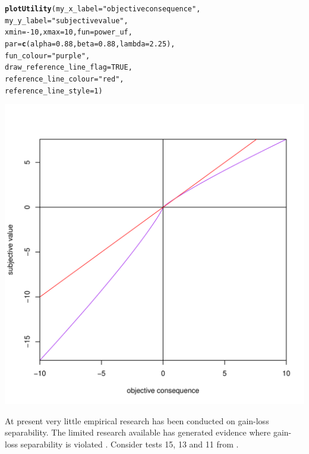 \documentclass{article}\usepackage[]{graphicx}\usepackage[]{color}
\makeatletter
\newcommand{\hlnum}[1]{\textcolor[rgb]{0.686,0.059,0.569}{#1}}%
\newcommand{\hlstr}[1]{\textcolor[rgb]{0.192,0.494,0.8}{#1}}%
\newcommand{\hlopt}[1]{\textcolor[rgb]{0,0,0}{#1}}%
\newcommand{\hlstd}[1]{\textcolor[rgb]{0.345,0.345,0.345}{#1}}%
\newcommand{\hlkwc}[1]{\textcolor[rgb]{0.333,0.667,0.333}{#1}}%
\newcommand{\hlkwd}[1]{\textcolor[rgb]{0.737,0.353,0.396}{\textbf{#1}}}%
\newenvironment{kframe}{%
 \def\at@end@of@kframe{}%
 \ifinner\ifhmode%
  \def\at@end@of@kframe{\end{minipage}}%
  \begin{minipage}{\columnwidth}%
 \fi\fi%
 \def\FrameCommand##1{\hskip\@totalleftmargin \hskip-\fboxsep
 \colorbox{shadecolor}{##1}\hskip-\fboxsep
     \hskip-\linewidth \hskip-\@totalleftmargin \hskip\columnwidth}%
 \MakeFramed {\advance\hsize-\width
   \@totalleftmargin\z@ \linewidth\hsize
   \@setminipage}}%
 {\par\unskip\endMakeFramed%
 \at@end@of@kframe}
\newenvironment{knitrout}{}{} %
\makeatother
\begin{document}
\begin{knitrout}
\color{fgcolor}\begin{kframe}
\begin{alltt}
\hlkwd{plotUtility}\hlstd{(}\hlkwc{my_x_label} \hlstd{=} \hlstr{"objective consequence"}\hlstd{,}
        \hlkwc{my_y_label} \hlstd{=} \hlstr{"subjective value"}\hlstd{,}
        \hlkwc{xmin} \hlstd{=} \hlopt{-}\hlnum{10}\hlstd{,} \hlkwc{xmax} \hlstd{=} \hlnum{10}\hlstd{,} \hlkwc{fun}\hlstd{=power_uf,}
        \hlkwc{par}\hlstd{=}\hlkwd{c}\hlstd{(}\hlkwc{alpha} \hlstd{=} \hlnum{0.88}\hlstd{,} \hlkwc{beta} \hlstd{=} \hlnum{0.88}\hlstd{,} \hlkwc{lambda} \hlstd{=} \hlnum{2.25}\hlstd{),}
        \hlkwc{fun_colour} \hlstd{=} \hlstr{"purple"}\hlstd{,}
        \hlkwc{draw_reference_line_flag} \hlstd{=} \hlnum{TRUE}\hlstd{,}
        \hlkwc{reference_line_colour} \hlstd{=} \hlstr{"red"}\hlstd{,}
        \hlkwc{reference_line_style} \hlstd{=} \hlnum{1}\hlstd{)}
\end{alltt}
\end{kframe}

{\centering \includegraphics[width=0.8\linewidth]{figure/unnamed-chunk-39} 

}



\end{knitrout}


At present very little empirical research has been conducted on gain-loss separability. The limited research available has generated evidence where gain-loss separability is violated \citep*{Birnbaum_Bahra_2007, Wu_Markle_2008, Por_Budescu_2013}. Consider tests 15, 13 and 11 from \citet[][Table 4 p. 1021]{Birnbaum_Bahra_2007}.
\end{document}
